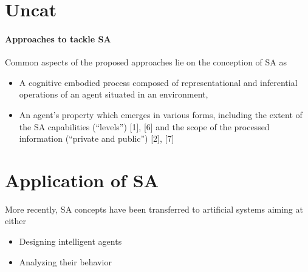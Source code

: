 \documentclass{article}
\begin{document}
		\section{Uncat}
			\paragraph{Approaches to tackle SA} Common aspects of the proposed approaches lie on the conception of SA as 
			\begin{itemize}
				\item A cognitive embodied process composed of representational and inferential operations of an agent situated in an environment,
				\item An agent’s property which emerges in various forms, including the extent of the SA capabilities (“levels”) \citet{regazzoni-2020-multi-sensorial-generative-and-descriptive-self-awareness-models-for-autonomous-systems}[1], \citet{regazzoni-2020-multi-sensorial-generative-and-descriptive-self-awareness-models-for-autonomous-systems}[6] and the scope of the processed information (“private and public”) \citet{regazzoni-2020-multi-sensorial-generative-and-descriptive-self-awareness-models-for-autonomous-systems}[2], \citet{regazzoni-2020-multi-sensorial-generative-and-descriptive-self-awareness-models-for-autonomous-systems}[7]
			\end{itemize}
		
		\section{Application of SA} More recently, SA concepts have been transferred to artificial systems aiming at either 
			\begin{itemize}
				\item Designing intelligent agents
				\item Analyzing their behavior
			\end{itemize}
\end{document}
